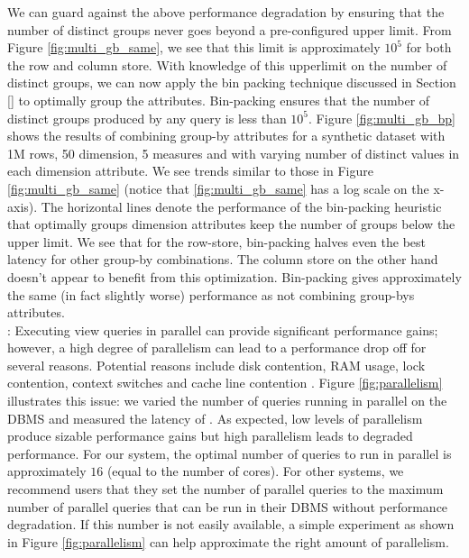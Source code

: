 We can guard against the above performance degradation by ensuring that the
number of distinct groups never goes beyond a pre-configured upper limit.
From Figure \ref{fig:multi_gb_same}, we see that this limit is approximately
$10^5$ for both the row and column store.
With knowledge of this upperlimit on the number of distinct groups, we can
now apply the bin packing technique discussed in Section \ref{} to optimally
group the attributes. 
Bin-packing ensures that the number of distinct groups produced by any
query is less than $10^5$. 
Figure \ref{fig:multi_gb_bp} shows the results of combining group-by attributes
for a synthetic dataset with  1M rows, 50 dimension, 5 measures and with varying
number of distinct values in each dimension attribute. 
We see trends similar to those in Figure \ref{fig:multi_gb_same} (notice that
\ref{fig:multi_gb_same} has a log scale on the x-axis).
The horizontal lines denote the performance of the bin-packing heuristic that
optimally groups dimension attributes keep the number of groups below the
upper limit.
We see that for the row-store, bin-packing halves even the best latency for
other group-by combinations. 
The column store on the other hand doesn't appear to benefit from this
optimization. 
Bin-packing gives approximately the same (in fact slightly worse) performance as
not combining group-bys attributes. \\

: 
Executing view queries in parallel can provide significant performance gains;
however, a high degree of parallelism can lead to a performance drop off for
several reasons. Potential reasons include disk contention, RAM usage, lock
contention, context switches and cache line contention \cite{Postgres_wiki}. 
Figure \ref{fig:parallelism} illustrates this issue: we varied the number of
queries running in parallel on the DBMS and measured the latency of
\VizRecDB.
As expected, low levels of parallelism produce sizable performance gains but
high parallelism leads to degraded performance.
For our system, the optimal number of queries to run in parallel is
approximately $16$ (equal to the number of cores).
For other systems, we recommend users that they set the number of parallel
queries to the maximum number of parallel queries that can be run in
their DBMS without performance degradation.
If this number is not easily available, a simple experiment as shown in Figure
\ref{fig:parallelism} can help approximate the right amount of parallelism. \\

